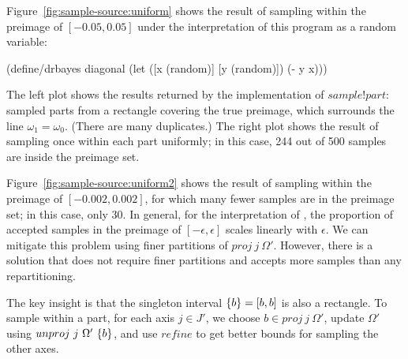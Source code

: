 Figure~\ref{fig:sample-source:uniform} shows the result of sampling within the preimage of $[-0.05,0.05]$ under the interpretation of this program as a random variable:
\begin{center}\singlespacing
\begin{schemedisplay}
(define/drbayes diagonal
  (let ([x  (random)]
        [y  (random)])
    (- y x)))
\end{schemedisplay}
\end{center}
The left plot shows the results returned by the implementation of $sample!part$: sampled parts from a rectangle covering the true preimage, which surrounds the line $\omega_1 = \omega_0$.
(There are many duplicates.)
The right plot shows the result of sampling once within each part uniformly; in this case, 244 out of 500 samples are inside the preimage set.

Figure~\ref{fig:sample-source:uniform2} shows the result of sampling within the preimage of $[-0.002,0.002]$, for which many fewer samples are in the preimage set; in this case, only 30.
In general, for the interpretation of , the proportion of accepted samples in the preimage of $[-\epsilon,\epsilon]$ scales linearly with $\epsilon$.
We can mitigate this problem using finer partitions of $proj~j~\Omega'$.
However, there is a solution that does not require finer partitions and accepts more samples than any repartitioning.

The key insight is that the singleton interval $\{{b}\} = [b,b]$ is also a rectangle.
To sample within a part, for each axis $j \in J'$, we choose $b \in proj~j~\Omega'$, update $\Omega'$ using $unproj~j~\Omega'~\{{b}\}$, and use $refine$ to get better bounds for sampling the other axes.

